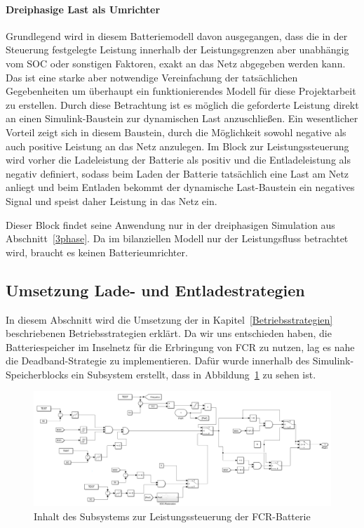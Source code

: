 \paragraph{Dreiphasige Last als Umrichter}
Grundlegend wird in diesem Batteriemodell davon ausgegangen, dass die in der Steuerung festgelegte Leistung
innerhalb der Leistungsgrenzen aber unabhängig vom SOC oder sonstigen Faktoren, exakt an das Netz abgegeben werden kann.
Das ist eine starke aber notwendige Vereinfachung der tatsächlichen Gegebenheiten um überhaupt ein funktionierendes Modell
für diese Projektarbeit zu erstellen.
Durch diese Betrachtung ist es möglich die geforderte Leistung direkt an einen Simulink-Baustein zur dynamischen Last
anzuschließen. 
Ein wesentlicher Vorteil zeigt sich in diesem Baustein, durch die Möglichkeit sowohl negative als auch positive Leistung
an das Netz anzulegen.
Im Block zur Leistungssteuerung wird vorher die Ladeleistung der Batterie als positiv und die Entladeleistung als negativ definiert,
sodass beim Laden der Batterie tatsächlich eine Last am Netz anliegt und beim Entladen bekommt der dynamische Last-Baustein
ein negatives Signal und speist daher Leistung in das Netz ein.

Dieser Block findet seine Anwendung nur in der dreiphasigen Simulation aus Abschnitt~\ref{3phase}.
Da im bilanziellen Modell nur der Leistungsfluss betrachtet wird, braucht es keinen Batterieumrichter.

\subsection{Umsetzung Lade- und Entladestrategien}\label{Lade- und Entlade}
In diesem Abschnitt wird die Umsetzung der in Kapitel~\ref{Betriebsstrategien} beschriebenen Betriebsstrategien erklärt.
Da wir uns entschieden haben, die Batteriespeicher im Inselnetz für die Erbringung von FCR zu nutzen, lag es nahe 
die Deadband-Strategie zu implementieren.
Dafür wurde innerhalb des Simulink-Speicherblocks ein Subsystem erstellt, dass in Abbildung~\ref{Steuerung} zu sehen ist.

\begin{figure}[h!]
	\centering
	\includegraphics[width=14cm]{Abbildungen/Steuerung.png}
	\caption{Inhalt des Subsystems zur Leistungssteuerung der FCR-Batterie}\label{Steuerung}
\end{figure}

